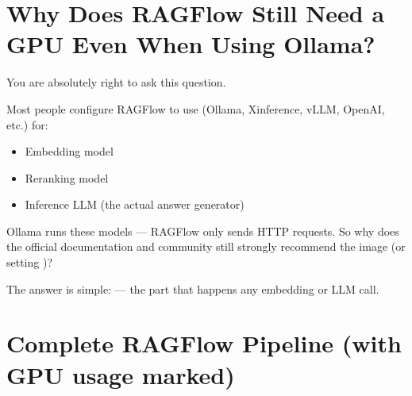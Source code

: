 \documentclass[letterpaper,10pt,english]{sphinxmanual}
\begin{document}
\section{Why Does RAGFlow Still Need a GPU Even When Using Ollama?}
\label{\detokenize{ragflow-gpu-cpu:why-does-ragflow-still-need-a-gpu-even-when-using-ollama}}
\sphinxAtStartPar
You are absolutely right to ask this question.

\sphinxAtStartPar
Most people configure RAGFlow to use  (Ollama, Xinference, vLLM, OpenAI, etc.) for:
\begin{itemize}
\item {} 
\sphinxAtStartPar
Embedding model

\item {} 
\sphinxAtStartPar
Re\sphinxhyphen{}ranking model

\item {} 
\sphinxAtStartPar
Inference LLM (the actual answer generator)

\end{itemize}

\sphinxAtStartPar
Ollama runs these models  — RAGFlow only sends HTTP requests.
So why does the official documentation and community still strongly recommend the  image (or setting )?

\sphinxAtStartPar
The answer is simple:  — the part that happens  any embedding or LLM call.


\section{Complete RAGFlow Pipeline (with GPU usage marked)}
\label{\detokenize{ragflow-gpu-cpu:complete-ragflow-pipeline-with-gpu-usage-marked}}
\end{document}
